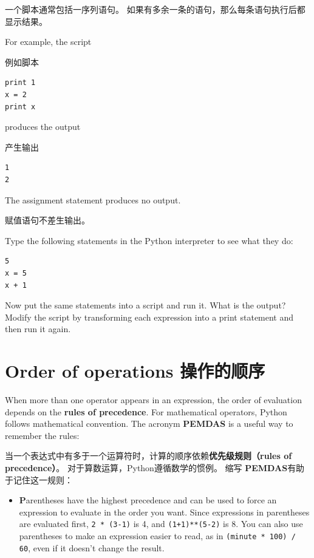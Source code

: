 \documentclass[10pt]{book}
\begin{document}
\begin{CJK}{UTF8}{gbsn}
一个脚本通常包括一序列语句。
如果有多余一条的语句，那么每条语句执行后都显示结果。

For example, the script

例如脚本

\begin{verbatim}
print 1
x = 2
print x
\end{verbatim}
%
produces the output

产生输出

\begin{verbatim}
1
2
\end{verbatim}
%
The assignment statement produces no output.

赋值语句不差生输出。

\begin{exercise}

Type the following statements in the Python interpreter to see
what they do:

\begin{verbatim}
5
x = 5
x + 1
\end{verbatim}
%
Now put the same statements into a script and run it.  What
is the output?  Modify the script by transforming each
expression into a print statement and then run it again.
\end{exercise}


\section{Order of operations 操作的顺序}

When more than one operator appears in an expression, the order of
evaluation depends on the {\bf rules of precedence}.  For
mathematical operators, Python follows mathematical convention.
The acronym {\bf PEMDAS} is a useful way to
remember the rules:

当一个表达式中有多于一个运算符时，计算的顺序依赖{\bf 优先级规则（rules of precedence）}。
对于算数运算，Python遵循数学的惯例。
缩写 {\bf PEMDAS}有助于记住这一规则：

\begin{itemize}

\item {\bf P}arentheses have the highest precedence and can be used 
to force an expression to evaluate in the order you want. Since
expressions in parentheses are evaluated first, {\tt 2 * (3-1)} is 4,
and {\tt (1+1)**(5-2)} is 8. You can also use parentheses to make an
expression easier to read, as in {\tt (minute * 100) / 60}, even
if it doesn't change the result.


\end{itemize}
\end{CJK}
\end{document}
